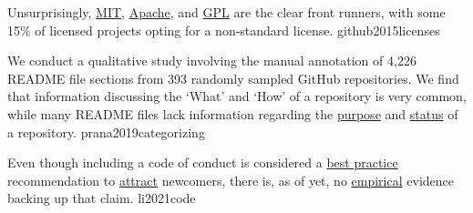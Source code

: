\documentclass{article}
\begin{document}
  {Unsurprisingly, \ul{MIT}, \ul{Apache}, and \ul{GPL} are the clear front runners, with some 15\% of licensed projects opting for a non-standard license.}
  {github2015licenses}



  {We conduct a qualitative study involving the manual annotation of 4,226 README file sections from 393 randomly sampled GitHub repositories. We find that information discussing the `What' and `How' of a repository is very common, while many README files lack information regarding the \ul{purpose} and \ul{status} of a repository.}
  {prana2019categorizing}



  {Even though including a code of conduct is considered a \ul{best practice} recommendation to \ul{attract} newcomers, there is, as of yet, no \ul{empirical} evidence backing up that claim.}
  {li2021code}
\end{document}
